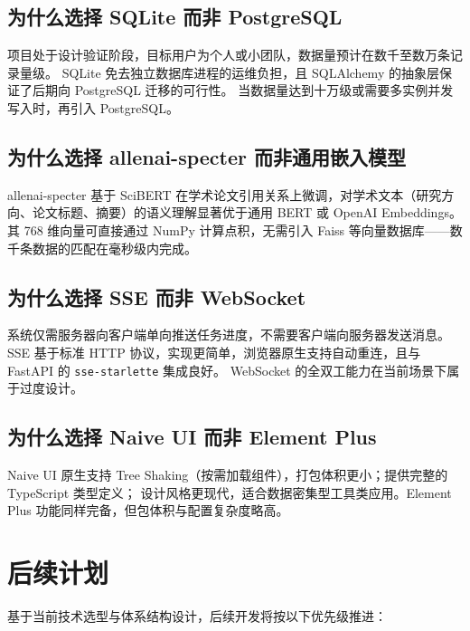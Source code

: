 \documentclass[11pt]{article}
\begin{document}
\subsection{为什么选择 SQLite 而非 PostgreSQL}

项目处于设计验证阶段，目标用户为个人或小团队，数据量预计在数千至数万条记录量级。
SQLite 免去独立数据库进程的运维负担，且 SQLAlchemy 的抽象层保证了后期向 PostgreSQL 迁移的可行性。
当数据量达到十万级或需要多实例并发写入时，再引入 PostgreSQL。

\subsection{为什么选择 allenai-specter 而非通用嵌入模型}

allenai-specter 基于 SciBERT 在学术论文引用关系上微调，对学术文本（研究方向、论文标题、摘要）的语义理解显著优于通用 BERT 或 OpenAI Embeddings。
其 768 维向量可直接通过 NumPy 计算点积，无需引入 Faiss 等向量数据库——数千条数据的匹配在毫秒级内完成。

\subsection{为什么选择 SSE 而非 WebSocket}

系统仅需服务器向客户端单向推送任务进度，不需要客户端向服务器发送消息。
SSE 基于标准 HTTP 协议，实现更简单，浏览器原生支持自动重连，且与 FastAPI 的 \texttt{sse-starlette} 集成良好。
WebSocket 的全双工能力在当前场景下属于过度设计。

\subsection{为什么选择 Naive UI 而非 Element Plus}

Naive UI 原生支持 Tree Shaking（按需加载组件），打包体积更小；提供完整的 TypeScript 类型定义；
设计风格更现代，适合数据密集型工具类应用。Element Plus 功能同样完备，但包体积与配置复杂度略高。

\section{后续计划}

基于当前技术选型与体系结构设计，后续开发将按以下优先级推进：
\end{document}
